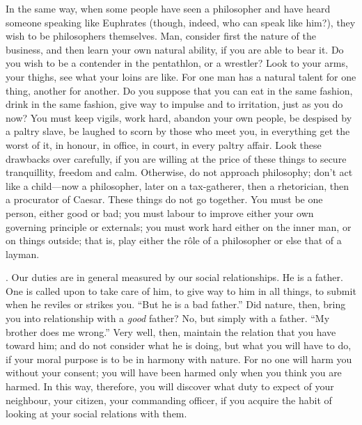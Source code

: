 In the same way, when some people have seen a philosopher and have heard someone speaking like Euphrates (though, indeed, who can speak like him?), they wish to be philosophers themselves. Man, consider first the nature of the business, and then learn your own natural ability, if you are able to bear it. Do you wish to be a contender in the pentathlon, or a wrestler? Look to your arms, your thighs, see what your loins are like. For one man has a natural talent for one thing, another for another. Do you suppose that you can eat in the same fashion, drink in the same fashion, give way to impulse and to irritation, just as you do now? You must keep vigils, work hard, abandon your own people, be despised by a paltry slave, be laughed to scorn by those who meet you, in everything get the worst of it, in honour, in office, in court, in every paltry affair. Look these drawbacks over carefully, if you are willing at the price of these things to secure tranquillity, freedom and calm. Otherwise, do not approach philosophy; don't act like a child—now a philosopher, later on a tax-gatherer, then a rhetorician, then a procurator of Caesar. These things do not go together. You must be one person, either good or bad; you must labour to improve either your own governing principle or externals; you must work hard either on the inner man, or on things outside; that is, play either the rôle of a philosopher or else that of a layman.

. Our duties are in general measured by our social relationships. He is a father. One is called upon to take care of him, to give way to him in all things, to submit when he reviles or strikes you. ``But he is a bad father.'' Did nature, then, bring you into relationship with a \emph{good} father? No, but simply with a father. ``My brother does me wrong.'' Very well, then, maintain the relation that you have toward him; and do not consider what he is doing, but what you will have to do, if your moral purpose is to be in harmony with nature. For no one will harm you without your consent; you will have been harmed only when you think you are harmed. In this way, therefore, you will discover what duty to expect of your neighbour, your citizen, your commanding officer, if you acquire the habit of looking at your social relations with them.

